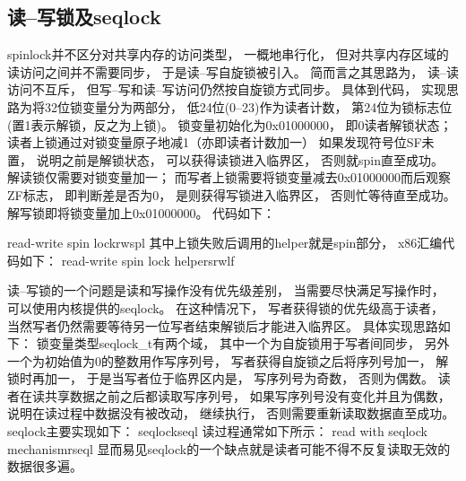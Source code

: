 \documentclass[11pt]{article}
\begin{document}
\subsection{读--写锁及seqlock}
spinlock并不区分对共享内存的访问类型，
一概地串行化，
但对共享内存区域的读访问之间并不需要同步，
于是读--写自旋锁被引入。
简而言之其思路为，
读--读访问不互斥，
但写--写和读--写访问仍然按自旋锁方式同步。
具体到代码，
实现思路为将32位锁变量分为两部分，
低24位(0--23)作为读者计数，
第24位为锁标志位(置1表示解锁，反之为上锁)。
锁变量初始化为0x01000000，
即0读者解锁状态；
读者上锁通过对锁变量原子地减1（亦即读者计数加一）%
如果发现符号位SF未置，
说明之前是解锁状态，
可以获得读锁进入临界区，
否则就spin直至成功。
解读锁仅需要对锁变量加一；
而写者上锁需要将锁变量减去0x01000000而后观察ZF标志，
即判断差是否为0，
是则获得写锁进入临界区，
否则忙等待直至成功。
解写锁即将锁变量加上0x01000000。
代码如下：

              {read-write spin lock}{rwspl}
其中上锁失败后调用的helper就是spin部分，
x86汇编代码如下：
              {read-write spin lock helpers}{rwlf}

读--写锁的一个问题是读和写操作没有优先级差别，
当需要尽快满足写操作时，
可以使用内核提供的seqlock。
在这种情况下，
写者获得锁的优先级高于读者，
当然写者仍然需要等待另一位写者结束解锁后才能进入临界区。
具体实现思路如下：
锁变量类型seqlock\_t有两个域，
其中一个为自旋锁用于写者间同步，
另外一个为初始值为0的整数用作写序列号，
写者获得自旋锁之后将序列号加一，
解锁时再加一，
于是当写者位于临界区内是，
写序列号为奇数，
否则为偶数。
读者在读共享数据之前之后都读取写序列号，
如果写序列号没有变化并且为偶数，
说明在读过程中数据没有被改动，
继续执行，
否则需要重新读取数据直至成功。
seqlock主要实现如下：
              {seqlock}{seql}
读过程通常如下所示：
              {read with seqlock mechanism}{rseql}
显而易见seqlock的一个缺点就是读者可能不得不反复读取无效的数据很多遍。
\end{document}
